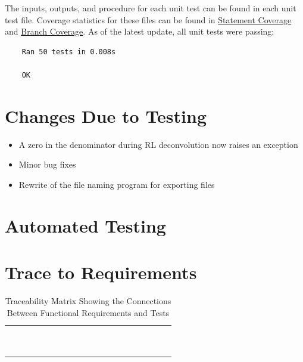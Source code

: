 \documentclass[12pt, titlepage]{article}
\begin{document}
The inputs, outputs, and procedure for each unit test can be found in each unit
test file. Coverage statistics for these files can be found in
\hyperref[ssec:StatCov]{Statement Coverage} and \hyperref[ssec:BrCov]{Branch
    Coverage}. As of the latest update, all unit tests were passing:

\begin{lstlisting}
    Ran 50 tests in 0.008s
    
    OK
\end{lstlisting}

\section{Changes Due to Testing}
\begin{itemize}
    \item A zero in the denominator during RL deconvolution now raises an exception
    \item Minor bug fixes
    \item Rewrite of the file naming program for exporting files
\end{itemize}
\section{Automated Testing}

\section{Trace to Requirements}

\begin{table}[H]
    \centering
    \begin{tabular}{|c|c|c|c|c|c|c|c|c|c|c|c|c|c|c|c|c|c|c|c|}
        \hline
        & & & & & \\
        \hline
             &  &  &  & & \\ \hline
                & &  & &  &  \\ \hline
                  &  & &  &  &  \\ \hline
             & &  &  &  &  \\ \hline
        & & &  &  &  \\ \hline
         & & &  &  &  \\ \hline
         &  &  & &  &  \\ \hline
         & & &  &  &  \\ \hline
          &  &  &  & &  \\ \hline
          &  &  &  &  & \\ \hline
    \end{tabular}
    \caption{Traceability Matrix Showing the Connections Between Functional Requirements and Tests}
    \label{Table:R_trace}
\end{table}
\end{document}
